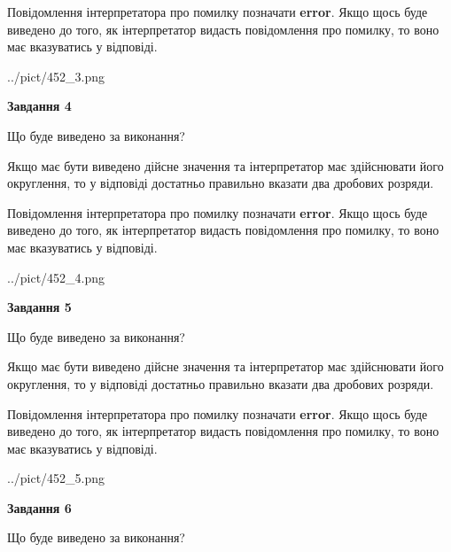 \documentclass[12pt, ukrainian]{article}
\begin{document}
{\begin {Large}
Повідомлення інтерпретатора про помилку позначати \textbf{error}.
Якщо щось буде виведено до того, як інтерпретатор видасть повідомлення про помилку, 
то воно має вказуватись у відповіді. \par

\begin{center}
	{../pict/452_3.png}
\end{center}
\newpage

{\begin {center}\textbf{Завдання 4}\end {center}}\par
Що буде виведено за виконання? \par

Якщо має бути виведено дійсне значення та інтерпретатор має здійснювати його округлення, 
то у відповіді достатньо правильно вказати два дробових розряди.

Повідомлення інтерпретатора про помилку позначати \textbf{error}.
Якщо щось буде виведено до того, як інтерпретатор видасть повідомлення про помилку, 
то воно має вказуватись у відповіді. \par

\begin{center}
	{../pict/452_4.png}
\end{center}
\newpage

{\begin {center}\textbf{Завдання 5}\end {center}}\par
Що буде виведено за виконання? \par

Якщо має бути виведено дійсне значення та інтерпретатор має здійснювати його округлення, 
то у відповіді достатньо правильно вказати два дробових розряди.

Повідомлення інтерпретатора про помилку позначати \textbf{error}.
Якщо щось буде виведено до того, як інтерпретатор видасть повідомлення про помилку, 
то воно має вказуватись у відповіді. \par

\begin{center}
	{../pict/452_5.png}
\end{center}
\newpage

{\begin {center}\textbf{Завдання 6}\end {center}}\par
Що буде виведено за виконання? \par


\end{Large}}
\end{document}
